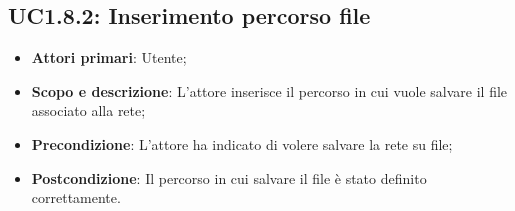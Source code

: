 \subsection{UC1.8.2: Inserimento percorso file} 
\hypertarget{UC1.8.2}{} 
\begin{itemize} 
	\item{\textbf{Attori primari}: Utente;} 
	\item{\textbf{Scopo e descrizione}: L'attore inserisce il percorso in cui vuole salvare il file associato alla rete;} 
	\item{\textbf{Precondizione}: L'attore ha indicato di volere salvare la rete su file;} 
	\item{\textbf{Postcondizione}: Il percorso in cui salvare il file è stato definito correttamente.} 
\end{itemize}
